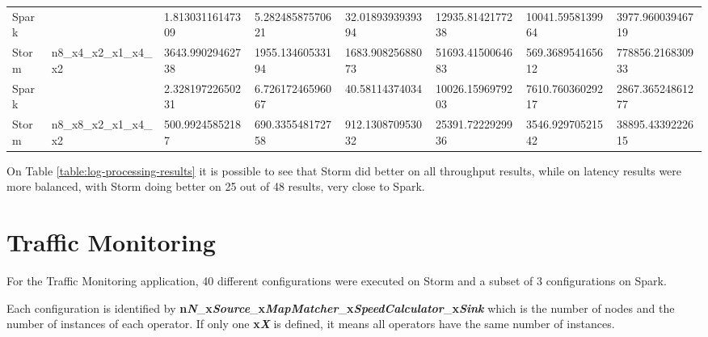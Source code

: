 \documentclass[ppgc,diss,english]{iiufrgs}
\begin{document}
\begin{table}[H]
\begin{tabular}{|l|l|l|l|l|l|l|l|}
Spark    &                                          & 1.81303116147309                         & 5.28248587570621                         & 32.0189393939394                         & \cellcolor[HTML]{67FD9A}12935.8142177238 & 10041.5958139964                         & \cellcolor[HTML]{67FD9A}3977.96003946719 \\ \cline{1-1} \cline{3-8} 
Storm    & \multirow{-2}{*}{n8\_x4\_x2\_x1\_x4\_x2} & \cellcolor[HTML]{67FD9A}3643.99029462738 & \cellcolor[HTML]{67FD9A}1955.13460533194 & \cellcolor[HTML]{67FD9A}1683.90825688073 & 51693.4150064683                         & \cellcolor[HTML]{67FD9A}569.368954165612 & 778856.216830933                         \\ \hline
Spark    &                                          & 2.32819722650231                         & 6.72617246596067                         & 40.58114374034                           & \cellcolor[HTML]{67FD9A}10026.1596979203 & 7610.76036029217                         & \cellcolor[HTML]{67FD9A}2867.36524861277 \\ \cline{1-1} \cline{3-8} 
Storm    & \multirow{-2}{*}{n8\_x8\_x2\_x1\_x4\_x2} & \cellcolor[HTML]{67FD9A}500.99245852187  & \cellcolor[HTML]{67FD9A}690.335548172758 & \cellcolor[HTML]{67FD9A}912.130870953032 & 25391.7222929936                         & \cellcolor[HTML]{67FD9A}3546.92970521542 & 38895.4339222615                         \\ \hline
\end{tabular}
\end{table}

On Table \ref{table:log-processing-results} it is possible to see that Storm did better on all throughput results, while on latency results were more balanced, with Storm doing better on 25 out of 48 results, very close to Spark.


\section{Traffic Monitoring}

For the Traffic Monitoring application, 40 different configurations were executed on Storm and a subset of 3 configurations on Spark.

Each configuration is identified by \textbf{n\textit{N}}\_\textbf{x\textit{Source}}\_\textbf{x\textit{MapMatcher}}\_\textbf{x\textit{SpeedCalculator}}\_\textbf{x\textit{Sink}} which is the number of nodes and the number of instances of each operator. If only one \textbf{x\textit{X}} is defined, it means all operators have the same number of instances.
\end{document}
